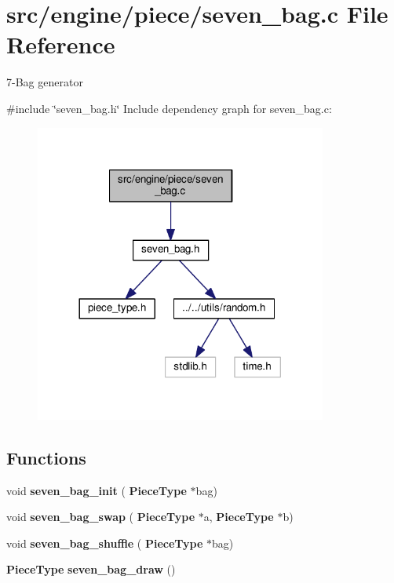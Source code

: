 \section{src/engine/piece/seven\+\_\+bag.c File Reference}
\label{seven__bag_8c}


7-\/\+Bag generator  


{\ttfamily \#include \char`\"{}seven\+\_\+bag.\+h\char`\"{}}\newline
Include dependency graph for seven\+\_\+bag.\+c\+:
\nopagebreak
\begin{figure}[H]
\begin{center}
\leavevmode
\includegraphics[width=272pt]{seven__bag_8c__incl}
\end{center}
\end{figure}
\subsection*{Functions}
\begin{DoxyCompactItemize}
\item 
void \textbf{ seven\+\_\+bag\+\_\+init} (\textbf{ Piece\+Type} $\ast$bag)
\item 
void \textbf{ seven\+\_\+bag\+\_\+swap} (\textbf{ Piece\+Type} $\ast$a, \textbf{ Piece\+Type} $\ast$b)
\item 
void \textbf{ seven\+\_\+bag\+\_\+shuffle} (\textbf{ Piece\+Type} $\ast$bag)
\item 
\textbf{ Piece\+Type} \textbf{ seven\+\_\+bag\+\_\+draw} ()
\end{DoxyCompactItemize}


